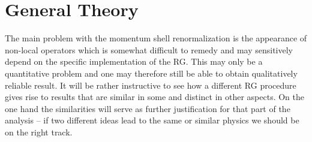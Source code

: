 \documentclass[english, parskip=full]{scrartcl}
\title{\titel}
\author{\autor}
\date{\today}
\begin{document}
\maketitle  %

\section{General Theory}
The main problem with the momentum shell renormalization is the appearance of non-local operators which is somewhat difficult to remedy and may sensitively depend on the specific implementation of the RG.
This may only be a quantitative problem and one may therefore still be able to obtain qualitatively reliable result.
It will be rather instructive to see how a different RG procedure gives rise to results that are similar in some and distinct in other aspects.
On the one hand the similarities will serve as further justification for that part of the analysis -- if two different ideas lead to the same or similar physics we should be on the right track.
\end{document}
